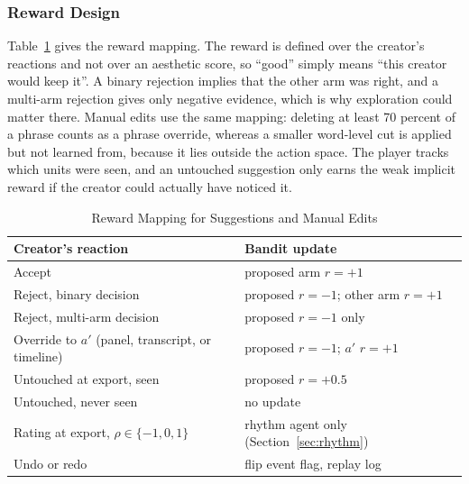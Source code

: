 \documentclass{ieeeaccess}
\begin{document}
\subsubsection{Reward Design}
Table~\ref{tab:reward} gives the reward mapping. The reward is defined over the creator's reactions and not over an aesthetic score, so ``good'' simply means ``this creator would keep it''. A binary rejection implies that the other arm was right, and a multi-arm rejection gives only negative evidence, which is why exploration could matter there. Manual edits use the same mapping: deleting at least 70 percent of a phrase counts as a phrase override, whereas a smaller word-level cut is applied but not learned from, because it lies outside the action space. The player tracks which units were seen, and an untouched suggestion only earns the weak implicit reward if the creator could actually have noticed it.

\begin{table}[t]
\caption{Reward Mapping for Suggestions and Manual Edits}
\label{tab:reward}
\setlength{\tabcolsep}{3pt}
\centering
\begin{tabular}{|p{42mm}|p{38mm}|}
\hline
Creator's reaction & Bandit update \\
\hline
Accept & proposed arm $r=+1$ \\
Reject, binary decision & proposed $r=-1$; other arm $r=+1$ \\
Reject, multi-arm decision & proposed $r=-1$ only \\
Override to $a'$ (panel, transcript, or timeline) & proposed $r=-1$; $a'$ $r=+1$ \\
Untouched at export, seen & proposed $r=+0.5$ \\
Untouched, never seen & no update \\
Rating at export, $\rho\in\{-1,0,1\}$ & rhythm agent only (Section~\ref{sec:rhythm}) \\
Undo or redo & flip event flag, replay log \\
\hline
\end{tabular}
\end{table}
\end{document}
